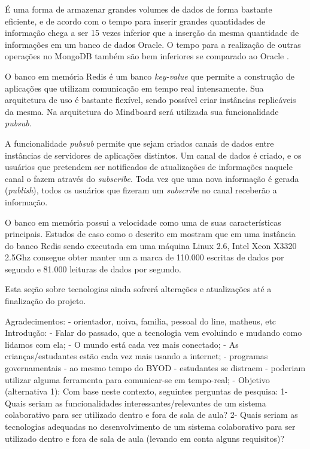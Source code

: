 É uma forma de armazenar grandes volumes de dados de forma bastante eficiente, e de acordo com \cite{mongodb} o tempo para inserir grandes quantidades de informação chega a ser 15 vezes inferior que a inserção da mesma quantidade de informações em um banco de dados Oracle. O tempo para a realização de outras operações no MongoDB também são bem inferiores se comparado ao Oracle \cite{mongodb}.

O banco em memória Redis \cite{redis_site} é um banco \emph{key-value} que permite a construção de aplicações que utilizam comunicação em tempo real intensamente. Sua arquitetura de uso é bastante flexível, sendo possível criar instâncias replicáveis da mesma. Na arquitetura do Mindboard será utilizada sua funcionalidade \emph{pubsub}.

A funcionalidade \emph{pubsub} \cite{redis_pubsub} permite que sejam criados canais de dados entre instâncias de servidores de aplicações distintos. Um canal de dados é criado, e os usuários que pretendem ser notificados de atualizações de informações naquele canal o fazem através do \emph{subscribe}. Toda vez que uma nova informação é gerada (\emph{publish}), todos os usuários que fizeram um \emph{subscribe} no canal receberão a informação.


O banco em memória possui a velocidade como uma de suas características principais. Estudos de caso como o descrito em \cite{redis_perf} mostram que em uma instância do banco Redis sendo executada em uma máquina Linux 2.6, Intel Xeon X3320 2.5Ghz consegue obter manter um a marca de 110.000 escritas de dados por segundo e 81.000 leituras de dados por segundo.

Esta seção sobre tecnologias ainda sofrerá alterações e atualizações até a finalização do projeto.









        Agradecimentos: 
            - orientador, noiva, familia, pessoal do line, matheus, etc
        Introdução:
            - Falar do passado, que a tecnologia vem evoluindo e mudando como lidamos com ela;
            - O mundo está cada vez mais conectado;
            - As crianças/estudantes estão cada vez mais usando a internet;
            - programas governamentais 
            - ao mesmo tempo do BYOD
                - estudantes se distraem
                - poderiam utilizar alguma ferramenta para comunicar-se em tempo-real;
            - Objetivo (alternativa 1):
                Com base neste contexto, seguintes perguntas de pesquisa:
                    1- Quais seriam as funcionalidades interessantes/relevantes de um sistema colaborativo para ser utilizado dentro e fora de sala de aula?
                    2- Quais seriam as tecnologias adequadas no desenvolvimento de um sistema colaborativo para ser utilizado dentro e fora de sala de aula (levando em conta alguns requisitos)?

